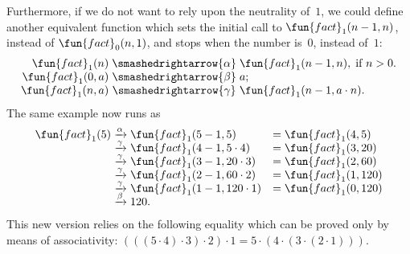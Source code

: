 Furthermore, if we do not want to rely upon the neutrality of~\(1\),
we could define another equivalent function  which
sets the initial call to \(\fun{fact}_1(n-1,n)\), instead of
\(\fun{fact}_0(n,1)\), and stops when the number is~\(0\), instead
of~\(1\):
\begin{equation*}
\begin{array}{r@{\;}c@{\;}l}
\fun{fact}_1(n) & \smashedrightarrow{\alpha} &
\fun{fact}_1(n-1,n),\;\text{if \(n > 0\)}.\\
\fun{fact}_1(0,a) & \smashedrightarrow{\beta} & a;\\
\fun{fact}_1(n,a) & \smashedrightarrow{\gamma} &
\fun{fact}_1(n-1,a \cdot n).
\end{array}
\end{equation*}
The same example now runs as
\begin{equation*}
\begin{array}{r@{\;}c@{\;}lc@{\;}l}
\fun{fact}_1(5)
& \xrightarrow{\smash[t]{\alpha}} & \fun{fact}_1(5-1,5)
& = & \fun{fact}_1(4,5)\\
& \xrightarrow{\smash[t]{\gamma}} & \fun{fact}_1(4-1,5 \cdot 4)
& = & \fun{fact}_1(3,20)\\
& \xrightarrow{\smash[t]{\gamma}} & \fun{fact}_1(3-1,20 \cdot 3)
& = & \fun{fact}_1(2,60)\\
& \xrightarrow{\smash[t]{\gamma}} & \fun{fact}_1(2-1,60 \cdot 2)
& = & \fun{fact}_1(1,120)\\
& \xrightarrow{\smash[t]{\gamma}} & \fun{fact}_1(1-1,120 \cdot 1)
& = & \fun{fact}_1(0,120)\\
& \xrightarrow{\smash[t]{\beta}} & 120.
\end{array}
\end{equation*}
This new version relies on the following equality which can be proved
only by means of associativity: \((((5 \cdot 4) \cdot 3) \cdot 2)
\cdot 1 = 5 \cdot (4 \cdot (3 \cdot (2 \cdot 1)))\).

